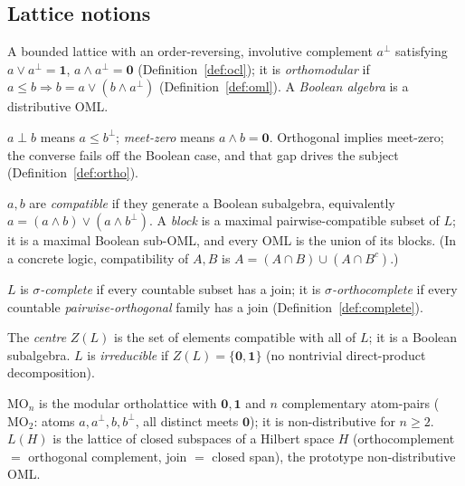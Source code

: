 \documentclass[11pt,reqno]{amsart}
\theoremstyle{plain}
\theoremstyle{definition}
\theoremstyle{remark}
\begin{document}
\subsection*{Lattice notions}

\begin{description}[style=nextline, leftmargin=1.5em, itemsep=3pt]
\item[Orthocomplemented lattice; orthomodular lattice (OML).]
  A bounded lattice with an order-reversing, involutive complement $a^\perp$
  satisfying $a\vee a^\perp=\mathbf 1$, $a\wedge a^\perp=\mathbf 0$
  (Definition~\ref{def:ocl}); it is \emph{orthomodular} if $a\leq b\Rightarrow
  b=a\vee(b\wedge a^\perp)$ (Definition~\ref{def:oml}). A \emph{Boolean algebra} is a
  distributive OML.
\item[Orthogonal; meet-zero; incomparable.]
  $a\perp b$ means $a\leq b^\perp$; \emph{meet-zero} means $a\wedge b=\mathbf 0$.
  Orthogonal implies meet-zero; the converse fails off the Boolean case, and that gap
  drives the subject (Definition~\ref{def:ortho}).
\item[Compatible; block.]
  $a,b$ are \emph{compatible} if they generate a Boolean subalgebra, equivalently
  $a=(a\wedge b)\vee(a\wedge b^\perp)$. A \emph{block} is a maximal pairwise-compatible
  subset of $L$; it is a maximal Boolean sub-OML, and every OML is the union of its
  blocks. (In a concrete logic, compatibility of $A,B$ is $A=(A\cap B)\cup(A\cap
  B^c)$.)
\item[Completeness.]
  $L$ is \emph{$\sigma$-complete} if every countable subset has a join; it is
  \emph{$\sigma$-orthocomplete} if every countable \emph{pairwise-orthogonal} family
  has a join (Definition~\ref{def:complete}).
\item[Centre; irreducible.]
  The \emph{centre} $Z(L)$ is the set of elements compatible with all of $L$; it is a
  Boolean subalgebra. $L$ is \emph{irreducible} if $Z(L)=\{\mathbf 0,\mathbf 1\}$
  (no nontrivial direct-product decomposition).
\item[$\mathrm{MO}_n$; $L(H)$.]
  $\mathrm{MO}_n$ is the modular ortholattice with $\mathbf 0,\mathbf 1$ and $n$
  complementary atom-pairs ($\mathrm{MO}_2$: atoms $a,a^\perp,b,b^\perp$, all distinct
  meets $\mathbf 0$); it is non-distributive for $n\geq 2$. $L(H)$ is the lattice of
  closed subspaces of a Hilbert space $H$ (orthocomplement $=$ orthogonal complement,
  join $=$ closed span), the prototype non-distributive OML.
\end{description}
\end{document}
